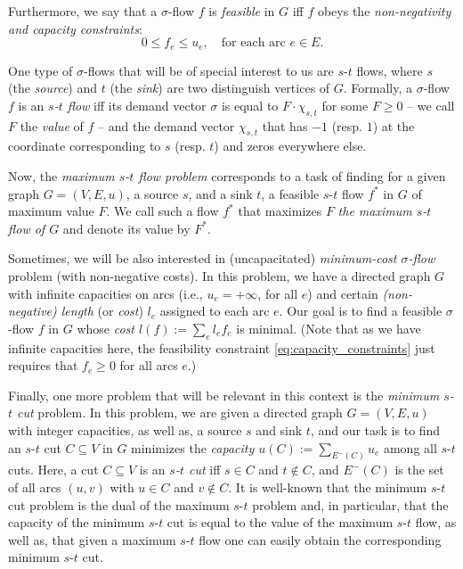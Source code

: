 \documentclass[11pt, letterpaper]{article}
\newcommand{\vsigma}{\boldsymbol{\mathit{\sigma}}}
\newcommand{\ff}{\boldsymbol{\mathit{f}}}
\newcommand{\uu}{\boldsymbol{\mathit{u}}}
\begin{document}
Furthermore, we say that a $\vsigma$-flow $\ff$ is {\em feasible} in $G$ iff $\ff$ obeys the {\em non-negativity and capacity constraints}:
\begin{equation}\label{eq:capacity_constraints}
0\leq f_e \leq u_e, \quad \text{for each arc $e\in E$}.
\end{equation} 

One type of $\vsigma$-flows that will be of special interest to us are $s$-$t$ flows, where $s$ (the {\em source}) and $t$ (the {\em sink}) are two distinguish vertices of $G$. Formally, a $\vsigma$-flow $\ff$ is an {\em $s$-$t$ flow} iff its demand vector $\vsigma$ is equal to $F\cdot \chi_{s,t}$ for some $F\geq 0$ -- we call $F$ the {\em value} of $\ff$ -- and the demand vector $\chi_{s,t}$ that has $-1$ (resp. $1$) at the coordinate corresponding to $s$ (resp. $t$) and zeros everywhere else. 

Now, the {\em maximum $s$-$t$ flow problem} corresponds to a task of finding for a given graph $G=(V,E,\uu)$, a source $s$, and a sink $t$, a feasible $s$-$t$ flow $\ff^*$ in $G$ of maximum value $F$. We call such a flow $\ff^*$ that maximizes $F$ {\em the maximum $s$-$t$ flow of $G$} and denote its value by $F^*$.

Sometimes, we will be also interested in (uncapacitated) {\em minimum-cost $\vsigma$-flow} problem (with non-negative costs). In this problem, we have a directed graph $G$ with infinite capacities on arcs (i.e., $u_e=+\infty$, for all $e$) and certain {\em (non-negative) length} (or {\em cost}) $l_e$ assigned to each arc $e$. Our goal is to find a feasible $\vsigma$-flow $\ff$ in $G$ whose {\em cost $l(\ff):=\sum_{e} l_e f_e$} is minimal. (Note that as we have infinite capacities here, the feasibility constraint \eqref{eq:capacity_constraints} just requires that $f_e\geq 0$ for all arcs $e$.)

Finally, one more problem that will be relevant in this context is the {\em minimum $s$-$t$ cut} problem. In this problem, we are given a directed graph $G=(V,E,\uu)$ with integer capacities, as well as, a source $s$ and sink $t$, and our task is to find an $s$-$t$ cut $C\subseteq V$ in $G$  minimizes the {\em capacity $\uu(C):=\sum_{E^{-}(C)} u_e$} among all $s$-$t$ cuts. Here, a cut $C\subseteq V$ is an {\em $s$-$t$ cut} iff $s\in C$ and $t\notin C$, and  $E^{-}(C)$ is the set of all arcs $(u,v)$ with $u\in C$ and $v\notin C$. It is well-known \cite{EliasFS56,FordF56} that the minimum $s$-$t$ cut problem is the dual of the maximum $s$-$t$ problem and, in particular, that the capacity of the minimum $s$-$t$ cut is equal to the value of the maximum $s$-$t$ flow, as well as, that given a maximum $s$-$t$ flow one can easily obtain the corresponding minimum $s$-$t$ cut. 
\end{document}
